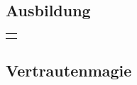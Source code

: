 \documentclass{dsa}
\begin{document}
\begin{dsaCharacterSheet}
\begin{multicols}{2}
         \columnbreak
         
         \subsection*{Ausbildung}
         \vspace{-8pt}
         
         \begin{dsaSheetBox}[8.5cm]
            \begin{tabu}{@{}p{8.2cm}}
                \hline
                \hline
                \hline
                \hline
                \hline
            \end{tabu}
         \end{dsaSheetBox}
         
      \end{multicols}
      
      \newcommand{\ritrow}[1]{\dsaRow{\tiny}{}{\dsaTextInput[7]{RitName#1}{3.4cm} &
                              \dsaTextInput[7]{RitProbA#1}{0.475cm}•\dsaTextInput[7]{RitProbB#1}{0.475cm}•\dsaTextInput[7]{RitProbC#1}{0.475cm} &
                              \dsaTextInput[7]{RitDauer#1}{1.3cm} & \dsaTextInput[7]{RitKosten#1}{1.3cm} & \dsaTextInput[7]{RitWirkung#1}{9.7cm}}}
      
      \subsection*{Vertrautenmagie}
      \vspace{-8pt}
      

\end{dsaCharacterSheet}
\end{document}
